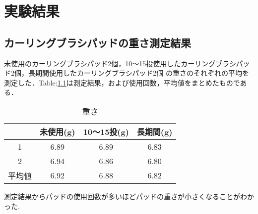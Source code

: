 \documentclass[main]{subfiles}
\begin{document}
\chapter{実験結果}
\section{カーリングブラシパッドの重さ測定結果}
未使用のカーリングブラシパッド2個，10～15投使用したカーリングブラシパッド2個，長期間使用したカーリングブラシパッド2個
の重さのそれぞれの平均を測定した．Table:\ref{table:ttab}は測定結果，および使用回数，平均値をまとめたものである．
\\   

\begin{table}
    \centering
    \caption{重さ}
    \label{table:ttab}
  \begin{tabular}{c|c|c|c}

     & 未使用(g) & 10～15投(g) & 長期間(g)\\ \hline
    1 & 6.89 & 6.89 & 6.83\\ \hline
    2 & 6.94 & 6.86 & 6.80\\ \hline
    平均値& 6.92 & 6.88 & 6.82  \\
  \end{tabular}
\end{table}
測定結果からパッドの使用回数が多いほどパッドの重さが小さくなることがわかった.
\end{document}
